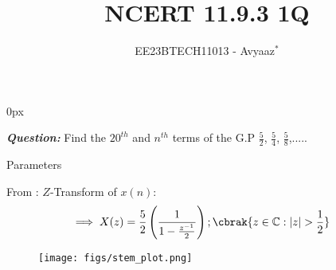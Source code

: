 \documentclass[journal,12pt,twocolumn]{IEEEtran}
\theoremstyle{remark}
\begin{document}
\parindent 0px

\vspace{3cm}

\title{NCERT 11.9.3 1Q}
\author{EE23BTECH11013 - Avyaaz$^{*}$%
}
\maketitle
\newpage
\bigskip

\renewcommand{\thefigure}{\arabic{figure}}
\renewcommand{\thetable}{\arabic{table}}
\large\textbf{\textsl{Question:}}
Find the $20^{th}$ and $n^{th}$ terms of the G.P $\frac{5}{2}$, $\frac{5}{4}$, $\frac{5}{8}$,.....

\solution
\fi
 \begin{table}[htbp]
     \centering
     \setlength{\extrarowheight}{8pt}
    
     \caption{Parameters}
     \label{tab:table1}
 \end{table} 


 
From :
\(Z\)-Transform of \(x(n)\):
\begin{align}
\implies X(z) &=\dfrac{5}{2}\left(\dfrac{1}{1-\frac{z^{-1}}{2}}\right) ;\cbrak{z\in\mathbb{C} : |z|>\dfrac{1}{2}}
\end{align}

\begin{figure}[ht]
    \centering
    \texttt{[image: figs/stem\_plot.png]}
    \caption{}
    \label{fig:graph1}
\end{figure} 


\end{document}
